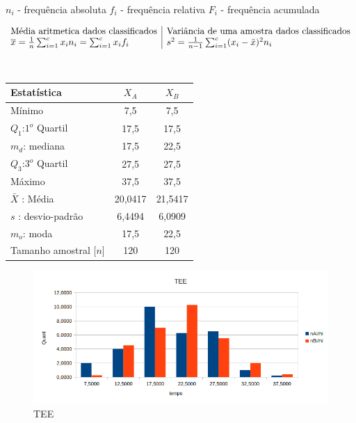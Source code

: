 \\
$n_i$ - frequência absoluta \quad
$f_i$ - frequência relativa \quad
$F_i$ - frequência acumulada \quad
\\
\begin{minipage}{0pt}
$$\begin{array}{l | l}
\text{Média aritmetica dados classificados} & \text{Variância de uma amostra dados classificados} \\
\overline{x} = \frac{1}{n}\sum_{i=1}^cx_in_i = \sum_{i=1}^cx_if_i & s^2 = \frac{1}{n-1}\sum_{i=1}^c (x_i-\bar{x})^2 n_i
\end{array}$$
\end{minipage}
\\
\begin{minipage}[!b]{0.40\linewidth}
\begin{tabular}{ l c c }
\hline
Estatística & $X_A$ & $X_B$ \\
\hline
Mínimo & 7,5 & 7,5\\
$Q_1$:$1^o$ Quartil & 17,5 & 17,5 \\
$m_d$: mediana & 17,5 & 22,5\\
$Q_3$:$3^o$ Quartil & 27,5 & 27,5 \\
Máximo & 37,5 & 37,5 \\
\hline
$\bar{X}$ : Média & 20,0417 & 21,5417 \\
$s$ : desvio-padrão & 6,4494 & 6,0909\\
$m_o$: moda & 17,5 & 22,5\\
\hline
Tamanho amostral [$n$] & 120 & 120 \\
\hline
\end{tabular}
\label{Tab:Resulatdos}
\end{minipage}
\hspace{2cm}
\begin{minipage}[!b]{0.40\linewidth}
\begin{figure}[H]
\centering
\includegraphics[scale=0.5]{./image/TEE.png}
\caption{TEE}
\label{TEE}
\end{figure}
\end{minipage}
